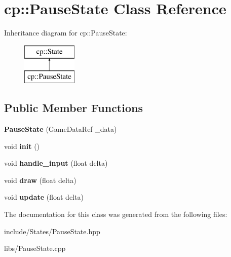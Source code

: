 \hypertarget{classcp_1_1_pause_state}{}\section{cp\+:\+:Pause\+State Class Reference}
\label{classcp_1_1_pause_state}
Inheritance diagram for cp\+:\+:Pause\+State\+:\begin{figure}[H]
\begin{center}
\leavevmode
\includegraphics[height=2.000000cm]{classcp_1_1_pause_state}
\end{center}
\end{figure}
\subsection*{Public Member Functions}
\begin{DoxyCompactItemize}
\item 
\mbox{\label{classcp_1_1_pause_state_a485171ecabc049352c644935bb1c9f26}} 
{\bfseries Pause\+State} (Game\+Data\+Ref \+\_\+data)
\item 
\mbox{\label{classcp_1_1_pause_state_a29233fd0d58f345f0a97781688fa5560}} 
void {\bfseries init} ()
\item 
\mbox{\label{classcp_1_1_pause_state_a8ba6fb40e19af3d9670db732b2768462}} 
void {\bfseries handle\+\_\+input} (float delta)
\item 
\mbox{\label{classcp_1_1_pause_state_a41f142f0e9aadc49328e9ec2c7b6209c}} 
void {\bfseries draw} (float delta)
\item 
\mbox{\label{classcp_1_1_pause_state_a4019da6ba2dda3756bd95a767f84e833}} 
void {\bfseries update} (float delta)
\end{DoxyCompactItemize}


The documentation for this class was generated from the following files\+:\begin{DoxyCompactItemize}
\item 
include/\+States/Pause\+State.\+hpp\item 
libs/Pause\+State.\+cpp\end{DoxyCompactItemize}
